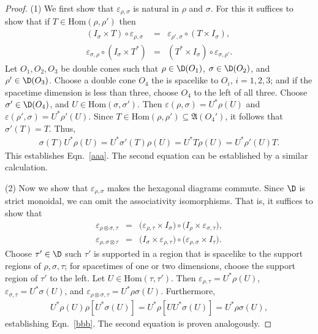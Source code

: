 \documentclass[11pt]{article}
\newcommand{\alg}[1]{\mathfrak{#1}}
\theoremstyle{definition}
\theoremstyle{definition}
\theoremstyle{remark}
\newcommand{\ve}{\varepsilon}
\newcommand{\Hom}{\mathrm{Hom}}
\begin{document}
\begin{proof} (1) We first show that $\ve _{\rho ,\sigma }$ is natural in $\rho$ and
  $\sigma$.  For this it suffices to show that if $T\in \Hom (\rho ,\rho ')$ then
\begin{eqnarray} 
  (I_{\sigma}\times T)\circ \ve _{\rho ,\sigma } &=& \ve _{\rho ',\sigma }\circ
  (T\times I_{\sigma}), \label{aaa} \\ 
  \ve _{\sigma ,\rho }\circ (I_{\sigma}\times T^*)  &=& (T^*\times I_{\sigma})\circ
  \ve _{\sigma ,\rho '} \label{nature}.
\end{eqnarray}
Let $O_1,O_2,O_3$ be double cones such that $\rho \in \D (O_1)$, $\sigma \in \D
(O_2)$, and $\rho '\in \D (O_3)$.  Choose a double cone $O_4$ the is spacelike to
$O_i$, $i=1,2,3$; and if the spacetime dimension is less than three, choose $O_4$ to
the left of all three.  Choose $\sigma '\in \D (O_4)$, and $U\in \Hom (\sigma ,\sigma
')$.  Then $\ve (\rho ,\sigma )=U^*\rho (U)$ and $\ve (\rho ',\sigma )=U^*\rho '(U)$.
Since $T\in \Hom (\rho ,\rho ')\subseteq \alg{A}(O_4')$, it follows that $\sigma
'(T)=T$.  Thus,
\begin{eqnarray*}
  \sigma (T)U^*\rho (U) = U^*\sigma '(T)\rho (U) =U^*T\rho (U)=U^*\rho '(U)T .
\end{eqnarray*}
This establishes Eqn.\ \ref{aaa}.  The second equation can be established by a
similar calculation.

\bigskip (2) Now we show that $\ve _{\rho ,\sigma}$ makes the hexagonal diagrams
commute.  Since $\D$ is strict monoidal, we can omit the associativity isomorphisms.
That is, it suffices to show that
\begin{eqnarray} 
  \ve _{\rho \otimes \sigma ,\tau} &=& \bigl( \ve _{\rho ,\tau }\times I_{\sigma}\bigr) \circ \bigl( I_{\rho }\times \ve
  _{\sigma ,\tau}\bigr) ,\label{bbb} \\
  \ve _{\rho ,\sigma \otimes \tau} &=& \bigl(I_{\sigma}\times \ve _{\rho ,\tau}
  \bigr) \circ \bigl( \ve _{\rho ,\sigma}\times I_{\tau} \bigr) \label{ccc} . 
\end{eqnarray}
Choose $\tau '\in \D$ such $\tau '$ is supported in a region that is spacelike to the
support regions of $\rho ,\sigma ,\tau$; for spacetimes of one or two dimensions,
choose the support region of $\tau '$ to the left.  Let $U\in \Hom (\tau ,\tau ')$.
Then $\ve _{\rho ,\tau}=U^*\rho (U)$, $\ve _{\sigma ,\tau}=U^*\sigma (U)$, and $\ve
_{\rho \otimes \sigma ,\tau}=U^*\rho \sigma (U)$.  Furthermore,
\begin{eqnarray*} U^*\rho (U)\rho [U^*\sigma (U)] = U^*\rho [UU^*\sigma (U)]=U^*\rho
  \sigma (U) ,\end{eqnarray*} establishing Eqn.\ \ref{bbb}.  The second equation is
proven analogously.
\end{proof}
\end{document}
